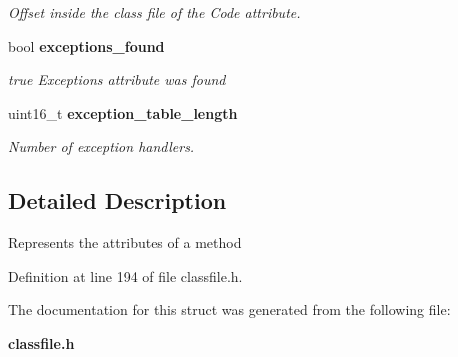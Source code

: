 \begin{DoxyCompactItemize}
\begin{DoxyCompactList}\small\item\em Offset inside the class file of the Code attribute. \item\end{DoxyCompactList}\item 
bool {\bf exceptions\_\-found}\label{structmethod__attributes__t_a6190fae167350d4f0b2e8422b013ad00}

\begin{DoxyCompactList}\small\item\em true Exceptions attribute was found \item\end{DoxyCompactList}\item 
uint16\_\-t {\bf exception\_\-table\_\-length}\label{structmethod__attributes__t_a6f974280d5ac950713cc30530388e790}

\begin{DoxyCompactList}\small\item\em Number of exception handlers. \item\end{DoxyCompactList}\end{DoxyCompactItemize}


\subsection{Detailed Description}
Represents the attributes of a method 

Definition at line 194 of file classfile.h.



The documentation for this struct was generated from the following file:\begin{DoxyCompactItemize}
\item 
{\bf classfile.h}\end{DoxyCompactItemize}
